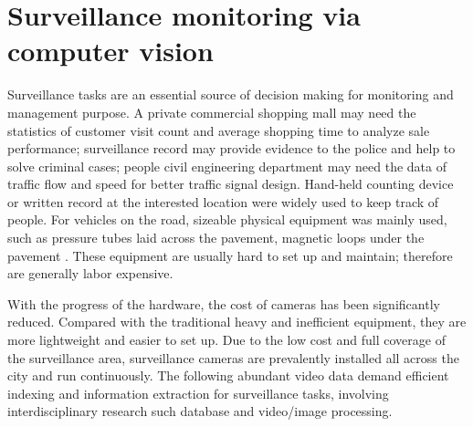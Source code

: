 \section{Surveillance monitoring via computer vision}
\label{sec:intro-surveillance}

Surveillance tasks are an essential source of decision making for monitoring and management purpose.
A private commercial shopping mall may need the statistics of customer visit count and average shopping time to analyze sale performance; 
surveillance record may provide evidence to the police and help to solve criminal cases;
people civil engineering department may need the data of traffic flow and speed for better traffic signal design.
Hand-held counting device or written record at the interested location were widely used to keep track of people.
For vehicles on the road, sizeable physical equipment was mainly used, such as pressure tubes laid across the pavement, magnetic loops under the pavement \cite{klein2006traffic,mimbela2000summary}. 
These equipment are usually hard to set up and maintain; therefore are generally labor expensive.

With the progress of the hardware, the cost of cameras has been significantly reduced. 
Compared with the traditional heavy and inefficient equipment, they are more lightweight and easier to set up. 
Due to the low cost and full coverage of the surveillance area, surveillance cameras are prevalently installed all across the city and run continuously.
The following abundant video data demand efficient indexing and information extraction for surveillance tasks, involving interdisciplinary research such database and video/image processing.

